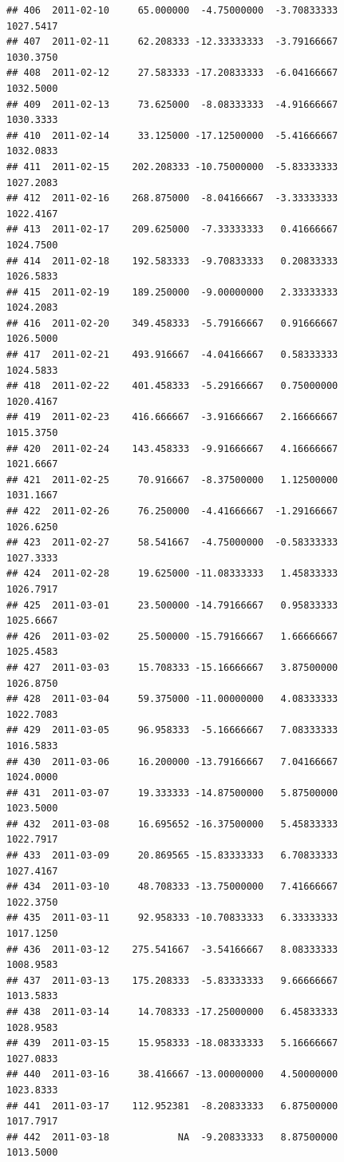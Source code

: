 \documentclass[
]{article}
\begin{document}
\begin{verbatim}
## 406  2011-02-10     65.000000  -4.75000000  -3.70833333    1027.5417
## 407  2011-02-11     62.208333 -12.33333333  -3.79166667    1030.3750
## 408  2011-02-12     27.583333 -17.20833333  -6.04166667    1032.5000
## 409  2011-02-13     73.625000  -8.08333333  -4.91666667    1030.3333
## 410  2011-02-14     33.125000 -17.12500000  -5.41666667    1032.0833
## 411  2011-02-15    202.208333 -10.75000000  -5.83333333    1027.2083
## 412  2011-02-16    268.875000  -8.04166667  -3.33333333    1022.4167
## 413  2011-02-17    209.625000  -7.33333333   0.41666667    1024.7500
## 414  2011-02-18    192.583333  -9.70833333   0.20833333    1026.5833
## 415  2011-02-19    189.250000  -9.00000000   2.33333333    1024.2083
## 416  2011-02-20    349.458333  -5.79166667   0.91666667    1026.5000
## 417  2011-02-21    493.916667  -4.04166667   0.58333333    1024.5833
## 418  2011-02-22    401.458333  -5.29166667   0.75000000    1020.4167
## 419  2011-02-23    416.666667  -3.91666667   2.16666667    1015.3750
## 420  2011-02-24    143.458333  -9.91666667   4.16666667    1021.6667
## 421  2011-02-25     70.916667  -8.37500000   1.12500000    1031.1667
## 422  2011-02-26     76.250000  -4.41666667  -1.29166667    1026.6250
## 423  2011-02-27     58.541667  -4.75000000  -0.58333333    1027.3333
## 424  2011-02-28     19.625000 -11.08333333   1.45833333    1026.7917
## 425  2011-03-01     23.500000 -14.79166667   0.95833333    1025.6667
## 426  2011-03-02     25.500000 -15.79166667   1.66666667    1025.4583
## 427  2011-03-03     15.708333 -15.16666667   3.87500000    1026.8750
## 428  2011-03-04     59.375000 -11.00000000   4.08333333    1022.7083
## 429  2011-03-05     96.958333  -5.16666667   7.08333333    1016.5833
## 430  2011-03-06     16.200000 -13.79166667   7.04166667    1024.0000
## 431  2011-03-07     19.333333 -14.87500000   5.87500000    1023.5000
## 432  2011-03-08     16.695652 -16.37500000   5.45833333    1022.7917
## 433  2011-03-09     20.869565 -15.83333333   6.70833333    1027.4167
## 434  2011-03-10     48.708333 -13.75000000   7.41666667    1022.3750
## 435  2011-03-11     92.958333 -10.70833333   6.33333333    1017.1250
## 436  2011-03-12    275.541667  -3.54166667   8.08333333    1008.9583
## 437  2011-03-13    175.208333  -5.83333333   9.66666667    1013.5833
## 438  2011-03-14     14.708333 -17.25000000   6.45833333    1028.9583
## 439  2011-03-15     15.958333 -18.08333333   5.16666667    1027.0833
## 440  2011-03-16     38.416667 -13.00000000   4.50000000    1023.8333
## 441  2011-03-17    112.952381  -8.20833333   6.87500000    1017.7917
## 442  2011-03-18            NA  -9.20833333   8.87500000    1013.5000

\end{verbatim}
\end{document}
